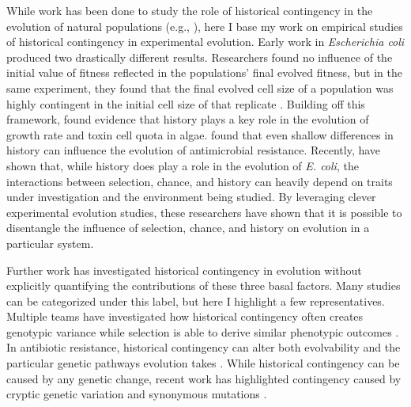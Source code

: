 While work has been done to study the role of historical contingency in the evolution of natural populations (e.g., \citep{lososContingencyDeterminismReplicated1998, kellerHistoryChanceAdaptation2008, okeIndependentLineagesCommon2019}), here I base my work on empirical studies of historical contingency in experimental evolution.
Early work in \textit{Escherichia coli} produced two drastically different results. 
Researchers found no influence of the initial value of fitness reflected in the populations' final evolved fitness, but in the same experiment, they found that the final evolved cell size of a population was highly contingent in the initial cell size of that replicate \citep{travisanoExperimentalTestsRoles1995}. 
Building off this framework, \citet{flores-moyaEffectsAdaptationChance2012} found evidence that history plays a key role in the evolution of growth rate and toxin cell quota in algae. 
\citet{santos-lopezRolesHistoryChance2021} found that even shallow differences in history can influence the evolution of antimicrobial resistance. 
Recently, \citet{smithFitnessEvolvingBacterial2022} have shown that, while history does play a role in the evolution of \textit{E. coli}, the interactions between selection, chance, and history can heavily depend on traits under investigation and the environment being studied. 
By leveraging clever experimental evolution studies, these researchers have shown that it is possible to disentangle the influence of selection, chance, and history on evolution in a particular system. 

Further work has investigated historical contingency in evolution without explicitly quantifying the contributions of these three basal factors.
Many studies can be categorized under this label, but here I highlight a few representatives. 
Multiple teams have investigated how historical contingency often creates genotypic variance while selection is able to derive similar phenotypic outcomes \citep{simoesPredictablePhenotypicNot2017,bedhommeGenotypicNotPhenotypic2013}.
In antibiotic resistance, historical contingency can alter both evolvability and the particular genetic pathways evolution takes \citep{cardGenomicEvolutionAntibiotic2021, cardHistoricalContingencyEvolution2019}.
While historical contingency can be caused by any genetic change, recent work has highlighted contingency caused by cryptic genetic variation \citep{zheng_cryptic_2019} and synonymous mutations \citep{mcgrathFitnessBenefitsSynonymous2024}.


